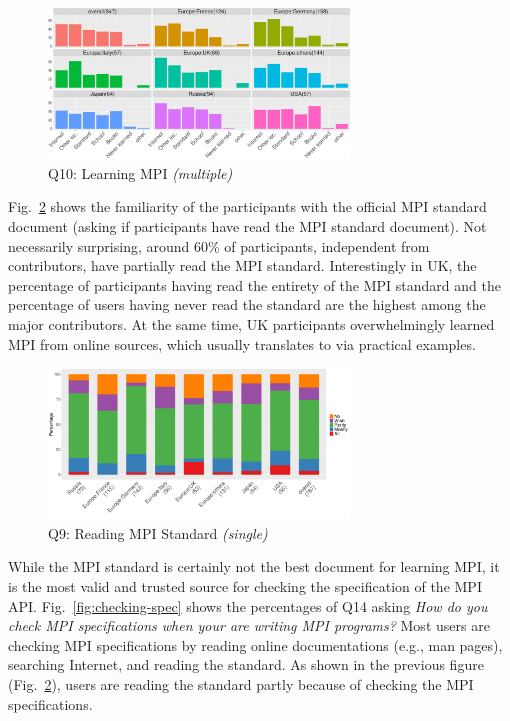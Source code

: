 \documentclass[preprint,5p,times]{elsarticle}
\def\myquote#1{{\it #1}}
\newcommand{\revision}[2]{{\color{blue}#2}}
\def\countries{contributors\xspace{}}%
\def\mcountries{major contributors\xspace{}}%
\begin{document}
\begin{figure}[tb]
\begin{center}
\includegraphics[width=8.0cm]{R-scripts/Q10.pdf}
\vspace{-2mm}
\caption{Q10: Learning MPI {\it(multiple)}}
\label{fig:learning-mpi}
\end{center}
\end{figure}

Fig.~\ref{fig:reading-standard} shows the familiarity of the participants with
the official MPI standard document (asking if participants have read the MPI
standard document). Not necessarily surprising, around 60\% of participants,
independent from \countries, have partially read the MPI standard. Interestingly
in UK, \revision{the percentage of participants having read the entirety of the MPI
standard is similar to the percentage of users having never read the
standard.}
{the percentage of participants having read the entirety of the MPI
standard and the percentage of users having never read the
standard are the highest among the \mcountries.}
\revision{In}{At the} same time, UK participants overwhelmingly learned MPI from online sources,
which usually \revision{translate by}{translates to} via practical examples.

\begin{figure}[tb]
\begin{center}
\includegraphics[width=8.0cm]{R-scripts/Q9.pdf}
\vspace{-2mm}
\caption{Q9: Reading MPI Standard {\it(single)}}
\label{fig:reading-standard}
\end{center}
\end{figure}

While the MPI standard is certainly not the best document for learning MPI, it
is the most valid and trusted source for checking the specification of the MPI
API. Fig.~\ref{fig:checking-spec} shows the percentages of Q14 asking
\myquote{How do you check MPI specifications when your are writing MPI
programs?} Most users are checking MPI specifications by reading online
documentations (e.g., man pages), searching Internet, and reading the standard.
As shown in the previous figure (Fig.~\ref{fig:reading-standard}), users are
reading the standard partly because of checking the MPI specifications.
\end{document}
